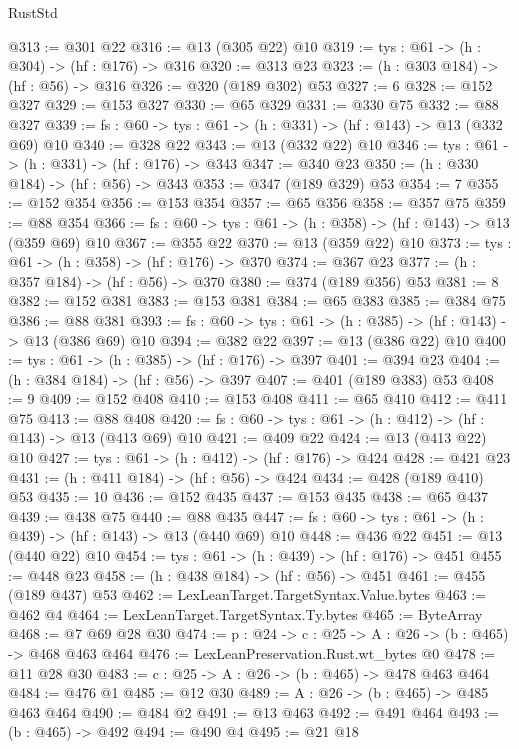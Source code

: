 \begin{lexlean}{RustStd}
\begin{coremodule}
{\begin{coremodule}
{{{{{@313 := @301 @22
@316 := @13 (@305 @22) @10
@319 := {tys : @61} -> (h : @304) -> (hf : @176) -> @316
@320 := @313 @23
@323 := (h : @303 @184) -> (hf : @56) -> @316
@326 := @320 (@189 @302) @53
@327 := 6
@328 := @152 @327
@329 := @153 @327
@330 := @65 @329
@331 := @330 @75
@332 := @88 @327
@339 := {fs : @60} -> {tys : @61} -> (h : @331) -> (hf : @143) -> @13 (@332 @69) @10
@340 := @328 @22
@343 := @13 (@332 @22) @10
@346 := {tys : @61} -> (h : @331) -> (hf : @176) -> @343
@347 := @340 @23
@350 := (h : @330 @184) -> (hf : @56) -> @343
@353 := @347 (@189 @329) @53
@354 := 7
@355 := @152 @354
@356 := @153 @354
@357 := @65 @356
@358 := @357 @75
@359 := @88 @354
@366 := {fs : @60} -> {tys : @61} -> (h : @358) -> (hf : @143) -> @13 (@359 @69) @10
@367 := @355 @22
@370 := @13 (@359 @22) @10
@373 := {tys : @61} -> (h : @358) -> (hf : @176) -> @370
@374 := @367 @23
@377 := (h : @357 @184) -> (hf : @56) -> @370
@380 := @374 (@189 @356) @53
@381 := 8
@382 := @152 @381
@383 := @153 @381
@384 := @65 @383
@385 := @384 @75
@386 := @88 @381
@393 := {fs : @60} -> {tys : @61} -> (h : @385) -> (hf : @143) -> @13 (@386 @69) @10
@394 := @382 @22
@397 := @13 (@386 @22) @10
@400 := {tys : @61} -> (h : @385) -> (hf : @176) -> @397
@401 := @394 @23
@404 := (h : @384 @184) -> (hf : @56) -> @397
@407 := @401 (@189 @383) @53
@408 := 9
@409 := @152 @408
@410 := @153 @408
@411 := @65 @410
@412 := @411 @75
@413 := @88 @408
@420 := {fs : @60} -> {tys : @61} -> (h : @412) -> (hf : @143) -> @13 (@413 @69) @10
@421 := @409 @22
@424 := @13 (@413 @22) @10
@427 := {tys : @61} -> (h : @412) -> (hf : @176) -> @424
@428 := @421 @23
@431 := (h : @411 @184) -> (hf : @56) -> @424
@434 := @428 (@189 @410) @53
@435 := 10
@436 := @152 @435
@437 := @153 @435
@438 := @65 @437
@439 := @438 @75
@440 := @88 @435
@447 := {fs : @60} -> {tys : @61} -> (h : @439) -> (hf : @143) -> @13 (@440 @69) @10
@448 := @436 @22
@451 := @13 (@440 @22) @10
@454 := {tys : @61} -> (h : @439) -> (hf : @176) -> @451
@455 := @448 @23
@458 := (h : @438 @184) -> (hf : @56) -> @451
@461 := @455 (@189 @437) @53
@462 := LexLeanTarget.TargetSyntax.Value.bytes
@463 := @462 @4
@464 := LexLeanTarget.TargetSyntax.Ty.bytes
@465 := ByteArray
@468 := @7 @69 @28 @30
@474 := {p : @24} -> {c : @25} -> {A : @26} -> (b : @465) -> @468 @463 @464
@476 := LexLeanPreservation.Rust.wt_bytes @0
@478 := @11 @28 @30
@483 := {c : @25} -> {A : @26} -> (b : @465) -> @478 @463 @464
@484 := @476 @1
@485 := @12 @30
@489 := {A : @26} -> (b : @465) -> @485 @463 @464
@490 := @484 @2
@491 := @13 @463
@492 := @491 @464
@493 := (b : @465) -> @492
@494 := @490 @4
@495 := @21 @18
}}}}}
\end{coremodule}}
\end{coremodule}
\end{lexlean}
